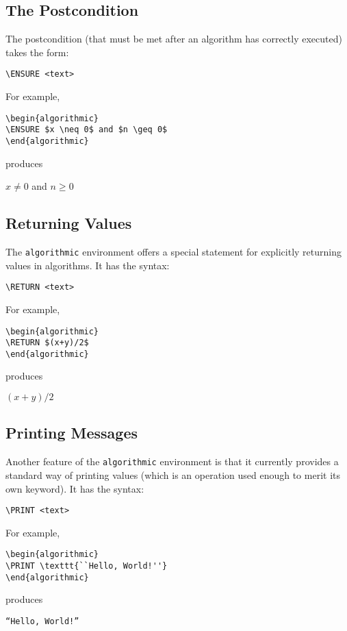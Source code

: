 \documentclass{article}
\newcommand{\keyword}[1]{\texttt{#1}}
\begin{document}
\subsection{The Postcondition}

The postcondition (that must be met after an algorithm has correctly
executed) takes the form:
\begin{verbatim}
\ENSURE <text>
\end{verbatim}
For example,
\begin{verbatim}
\begin{algorithmic}
\ENSURE $x \neq 0$ and $n \geq 0$
\end{algorithmic}
\end{verbatim}
produces
\begin{algorithmic}
  \ENSURE $x \neq 0$ and $n \geq 0$
\end{algorithmic}

\subsection{Returning Values}

The \keyword{algorithmic} environment offers a special statement for
explicitly returning values in algorithms. It has the syntax:
\begin{verbatim}
\RETURN <text>
\end{verbatim}
For example,
\begin{verbatim}
\begin{algorithmic}
\RETURN $(x+y)/2$
\end{algorithmic}
\end{verbatim}
produces
\begin{algorithmic}
  \RETURN $(x+y)/2$
\end{algorithmic}

\subsection{Printing Messages}

Another feature of the \keyword{algorithmic} environment is that it
currently provides a standard way of printing values (which is an operation
used enough to merit its own keyword). It has the syntax:
\begin{verbatim}
\PRINT <text>
\end{verbatim}
For example,
\begin{verbatim}
\begin{algorithmic}
\PRINT \texttt{``Hello, World!''}
\end{algorithmic}
\end{verbatim}
produces
\begin{algorithmic}
  \PRINT \texttt{``Hello, World!''}
\end{algorithmic}
\end{document}
